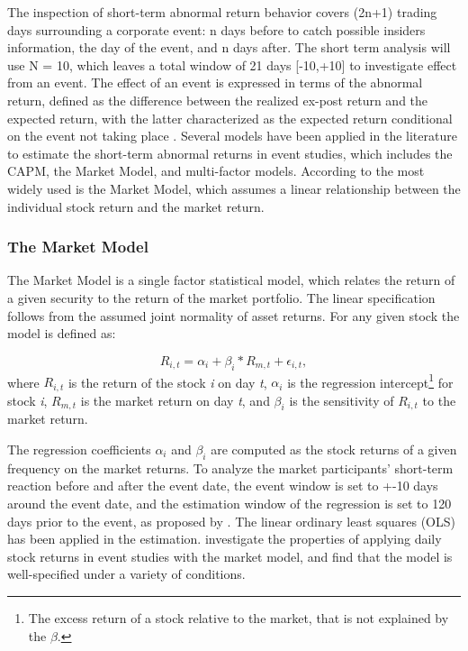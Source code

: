 The inspection of short-term abnormal return behavior covers (2n+1) trading days surrounding a corporate event: n days before to catch possible insiders information, the day of the event, and n days after. The short term analysis will use N = 10, which leaves a total window of 21 days [-10,+10] to investigate effect from an event. The effect of an event is expressed in terms of the abnormal return, defined as the difference between the realized ex-post return and the expected return, with the latter characterized as the expected return conditional on the event not taking place \citep{Event_studies}. Several models have been applied in the literature to estimate the short-term abnormal returns in event studies, which includes the CAPM, the Market Model, and multi-factor models. According to \cite{holler2014event} the most widely used is the Market Model, which assumes a linear relationship between the individual stock return and the market return. 

\subsubsection{The Market Model}

The Market Model is a single factor statistical model, which relates the return of a given security to the return of the market portfolio. The linear specification follows from the assumed joint normality of asset returns. For any given stock the model is defined as:

\begin{equation} \label{market_model}
    R_{i,t} = \alpha_i + \beta_i * R_{m,t} + \epsilon_{i,t},
\end{equation}
 where $R_{i,t}$ is the return of the stock \textit{i} on day \textit{t}, $\alpha_i$ is the regression intercept\footnote{The excess return of a stock relative to the market, that is not explained by the $\beta$.} for stock \textit{i}, $R_{m,t}$ is the market return on day \textit{t}, and
 $\beta_i$ is the sensitivity of $R_{i,t}$ to the market return.  

 The regression coefficients $\alpha_i$ and $\beta_i$ are computed as the stock returns of a given frequency on the market returns. To analyze the market participants' short-term reaction before and after the event date, the event window is set to +-10 days around the event date, and the estimation window of the regression is set to 120 days prior to the event, as proposed by \cite{Event_studies}. The linear ordinary least squares (OLS) has been applied in the estimation. \cite{brown1985using} investigate the properties of applying daily stock returns in event studies with the market model, and find that the model is well-specified under a variety of conditions. 

